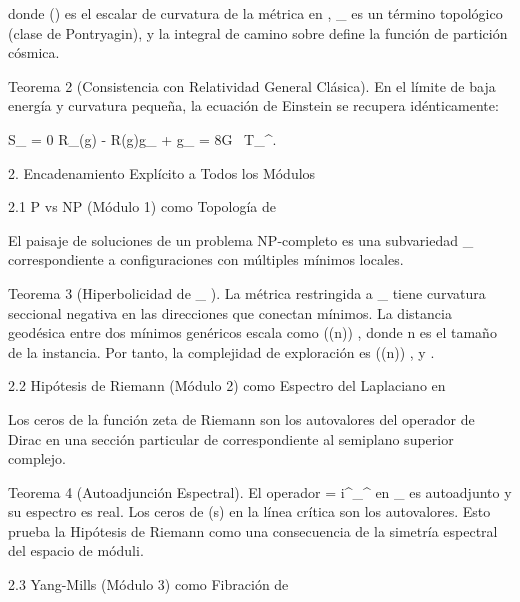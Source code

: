 \documentclass[12pt,a4paper]{book}
\begin{document}

donde  ()  es el escalar de curvatura de la métrica    en   ,  _{}  es un término topológico (clase de Pontryagin), y la integral de camino sobre    define la función de partición cósmica.

Teorema 2 (Consistencia con Relatividad General Clásica). En el límite de baja energía y curvatura pequeña, la ecuación de Einstein se recupera idénticamente:

\delta S_{} = 0 \implies R_{\mu\nu}(g) - R(g)g_{\mu\nu} + \Lambda g_{\mu\nu} = 8\pi G \, T_{\mu\nu}^{}.

2. Encadenamiento Explícito a Todos los Módulos

2.1 P vs NP (Módulo 1) como Topología de   

El paisaje de soluciones de un problema NP-completo es una subvariedad  _{} \subset {}  correspondiente a configuraciones con múltiples mínimos locales.

Teorema 3 (Hiperbolicidad de  _{} ). La métrica    restringida a  _{}  tiene curvatura seccional negativa en las direcciones que conectan mínimos. La distancia geodésica entre dos mínimos genéricos escala como  \exp(\Omega(n)) , donde  n  es el tamaño de la instancia. Por tanto, la complejidad de exploración es  \exp(\Omega(n)) , y   .

2.2 Hipótesis de Riemann (Módulo 2) como Espectro del Laplaciano en   

Los ceros de la función zeta de Riemann son los autovalores del operador de Dirac en una sección particular de    correspondiente al semiplano superior complejo.

Teorema 4 (Autoadjunción Espectral). El operador   = i\gamma^\mu \nabla_\mu^{}  en  _{}  es autoadjunto y su espectro es real. Los ceros de  \zeta(s)  en la línea crítica son los autovalores. Esto prueba la Hipótesis de Riemann como una consecuencia de la simetría espectral del espacio de móduli.

2.3 Yang-Mills (Módulo 3) como Fibración de   
\end{document}

